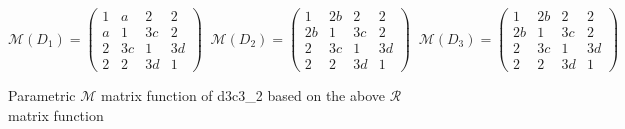 \documentclass[12pt,a4paper]{article}
\numberwithin{equation}{section}
\theoremstyle{plain}%
\theoremstyle{definition}
\theoremstyle{remark}
\begin{document}
\begin{figure}
  \caption{\label{fig:d3c3_2_pm} Parametric $\mathcal{M}$ matrix function of
  d3c3\_2 based on the above $\mathcal{R}$ matrix function}
  \begin{equation*}
    \mathcal{M}(D_1)=
    \left(
    \begin{array}{cccc}
      1 & a & 2 & 2\\
      a & 1 & 3c & 2\\
      2 & 3c & 1 & 3d\\
      2 & 2 & 3d & 1
    \end{array}
    \right)\;\;
    \mathcal{M}(D_2)=
    \left(
    \begin{array}{cccc}
      1 & 2b & 2 & 2\\
      2b & 1 & 3c & 2\\
      2 & 3c & 1 & 3d\\
      2 & 2 & 3d & 1
    \end{array}
    \right)\;\;
    \mathcal{M}(D_3)=
    \left(
    \begin{array}{cccc}
      1 & 2b & 2 & 2\\
      2b & 1 & 3c & 2\\
      2 & 3c & 1 & 3d\\
      2 & 2 & 3d & 1
    \end{array}
    \right)
  \end{equation*}
\end{figure}
\end{document}
